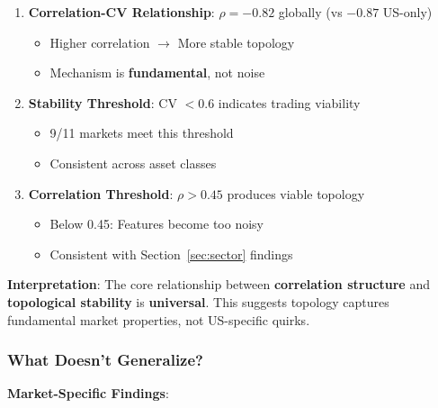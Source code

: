\begin{enumerate}
\item \textbf{Correlation-CV Relationship}: $\rho = -0.82$ globally (vs $-0.87$ US-only)
   \begin{itemize}
   \item Higher correlation $\rightarrow$ More stable topology
   \item Mechanism is \textbf{fundamental}, not noise
   \end{itemize}

\item \textbf{Stability Threshold}: CV $< 0.6$ indicates trading viability
   \begin{itemize}
   \item 9/11 markets meet this threshold
   \item Consistent across asset classes
   \end{itemize}

\item \textbf{Correlation Threshold}: $\rho > 0.45$ produces viable topology
   \begin{itemize}
   \item Below 0.45: Features become too noisy
   \item Consistent with Section~\ref{sec:sector} findings
   \end{itemize}
\end{enumerate}

\textbf{Interpretation}: The core relationship between \textbf{correlation structure} and \textbf{topological stability} is \textbf{universal}. This suggests topology captures fundamental market properties, not US-specific quirks.

\subsubsection{What Doesn't Generalize?}

\textbf{Market-Specific Findings}:

